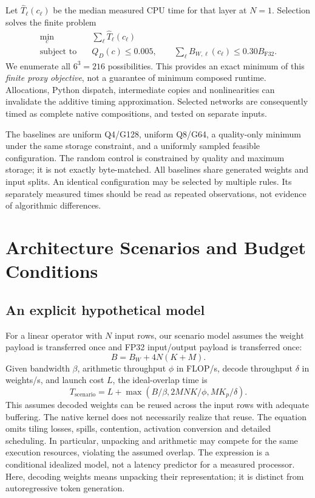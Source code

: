 \documentclass[11pt]{article}
\begin{document}
Let $\widehat T_\ell(c_\ell)$ be the median measured CPU time for that layer at
$N=1$. Selection solves the finite problem
\begin{align}
\min_c\quad &\sum_\ell\widehat T_\ell(c_\ell)\\
\text{subject to}\quad &Q_D(c)\leq 0.005,\qquad
\sum_\ell B_{W,\ell}(c_\ell)\leq 0.30 B_{\mathrm{F32}}.
\end{align}
We enumerate all $6^3=216$ possibilities. This provides an exact minimum of this
\emph{finite proxy objective}, not a guarantee of minimum composed runtime.
Allocations, Python dispatch, intermediate copies and nonlinearities can invalidate
the additive timing approximation. Selected networks are consequently timed as
complete native compositions, and tested on separate inputs.

The baselines are uniform Q4/G128, uniform Q8/G64, a quality-only minimum under the
same storage constraint, and a uniformly sampled feasible configuration. The random
control is constrained by quality and maximum storage; it is not exactly
byte-matched. All baselines share generated weights and input splits. An identical
configuration may be selected by multiple rules. Its separately measured times
should be read as repeated observations, not evidence of algorithmic differences.

\section{Architecture Scenarios and Budget Conditions}
\subsection{An explicit hypothetical model}
For a linear operator with $N$ input rows, our scenario model assumes the weight
payload is transferred once and FP32 input/output payload is transferred once:
\begin{equation}
B=B_W+4N(K+M).
\end{equation}
Given bandwidth $\beta$, arithmetic throughput $\phi$ in FLOP/s, decode throughput
$\delta$ in weights/s, and launch cost $L$, the ideal-overlap time is
\begin{equation}
T_{\mathrm{scenario}}=L+\max\left(B/\beta,
2MNK/\phi,MK_p/\delta\right).
\label{eq:time}
\end{equation}
This assumes decoded weights can be reused across the input rows with adequate
buffering. The native kernel does not necessarily realize that reuse. The equation
omits tiling losses, spills, contention, activation conversion and detailed
scheduling. In particular, unpacking and arithmetic may compete for the same
execution resources, violating the assumed overlap. The expression is a conditional
idealized model, not a latency predictor for a measured processor. Here, decoding
weights means unpacking their representation; it is distinct from autoregressive
token generation.
\end{document}

